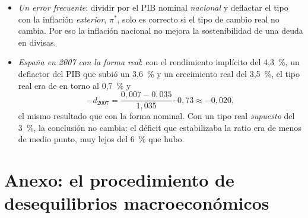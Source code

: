 \documentclass[11pt]{article}
\begin{document}
\begin{itemize}
\[  \]
  Como el tipo real es $q=EP^*/P$, $1+\gamma_q=(1+\gamma_E)(1+\pi^*)/(1+\pi)$, y con $1+r^*\equiv(1+i^*)/(1+\pi^*)$ sale~\eqref{eq:deuda-divisas}. Con la paridad del poder adquisitivo ($\gamma_q=0$) es la real~\eqref{eq:deuda-externa}. \findemo
\item \emph{Un error frecuente}: dividir por el PIB nominal \emph{nacional} y deflactar el tipo con la inflación \emph{exterior}, $\pi^*$, solo es correcto si el tipo de cambio real no cambia. Por eso la inflación nacional no mejora la sostenibilidad de una deuda en divisas.
\item \emph{España en 2007 con la forma real}: con el rendimiento implícito del 4,3~\%, un deflactor del PIB que subió un 3,6~\% y un crecimiento real del 3,5~\%, el tipo real era de en torno al 0,7~\% y
  \[
  -d_{2007}=\frac{0{,}007-0{,}035}{1{,}035}\cdot0{,}73\approx-0{,}020 ,
  \]
  el mismo resultado que con la forma nominal. Con un tipo real \emph{supuesto} del 3~\%, la conclusión no cambia: el déficit que estabilizaba la ratio era de menos de medio punto, muy lejos del 6~\% que hubo\nocite{Eurostat2026bopc6a,Eurostat2026nama10gdp}.
\end{itemize}

\section{Anexo: el procedimiento\cortetitulo{} de desequilibrios macroeconómicos}\label{anexo:pdm}
\end{document}
